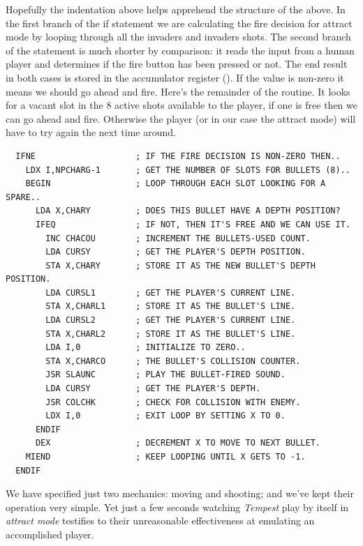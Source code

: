 Hopefully the indentation above helps apprehend the structure of the above. In the first
branch of the if statement we are calculating the fire decision for attract mode by looping
through all the invaders and invaders shots. The second branch of the  statement
is much shorter by comparison: it reads the input from a human player and determines if the
fire button has been pressed or not. The end result in both cases is stored in the accumulator
register (). If the value is non-zero it means we should go ahead and fire. Here's
the remainder of the  routine. It looks for a vacant slot in the 8 active shots
available to the player, if one is free then we can go ahead and fire. Otherwise the player
(or in our case the attract mode) will have to try again the next time around.

\clearpage
\begin{lstlisting}
  IFNE                    ; IF THE FIRE DECISION IS NON-ZERO THEN..
    LDX I,NPCHARG-1       ; GET THE NUMBER OF SLOTS FOR BULLETS (8)..
    BEGIN                 ; LOOP THROUGH EACH SLOT LOOKING FOR A SPARE.. 
      LDA X,CHARY         ; DOES THIS BULLET HAVE A DEPTH POSITION?
      IFEQ                ; IF NOT, THEN IT'S FREE AND WE CAN USE IT.
        INC CHACOU        ; INCREMENT THE BULLETS-USED COUNT.
        LDA CURSY         ; GET THE PLAYER'S DEPTH POSITION.
        STA X,CHARY       ; STORE IT AS THE NEW BULLET'S DEPTH POSITION.
        LDA CURSL1        ; GET THE PLAYER'S CURRENT LINE.
        STA X,CHARL1      ; STORE IT AS THE BULLET'S LINE.
        LDA CURSL2        ; GET THE PLAYER'S CURRENT LINE.
        STA X,CHARL2      ; STORE IT AS THE BULLET'S LINE.
        LDA I,0           ; INITIALIZE TO ZERO..
        STA X,CHARCO      ; THE BULLET'S COLLISION COUNTER.
        JSR SLAUNC        ; PLAY THE BULLET-FIRED SOUND.
        LDA CURSY         ; GET THE PLAYER'S DEPTH.
        JSR COLCHK        ; CHECK FOR COLLISION WITH ENEMY.
        LDX I,0           ; EXIT LOOP BY SETTING X TO 0.
      ENDIF
      DEX                 ; DECREMENT X TO MOVE TO NEXT BULLET.
    MIEND                 ; KEEP LOOPING UNTIL X GETS TO -1.
  ENDIF
\end{lstlisting}

We have specified just two mechanics: moving and shooting; and we've kept
their operation very simple. Yet just a few seconds watching \textit{Tempest}
play by itself in \textit{attract mode} testifies to their unreasonable
effectiveness at emulating an accomplished player.  
